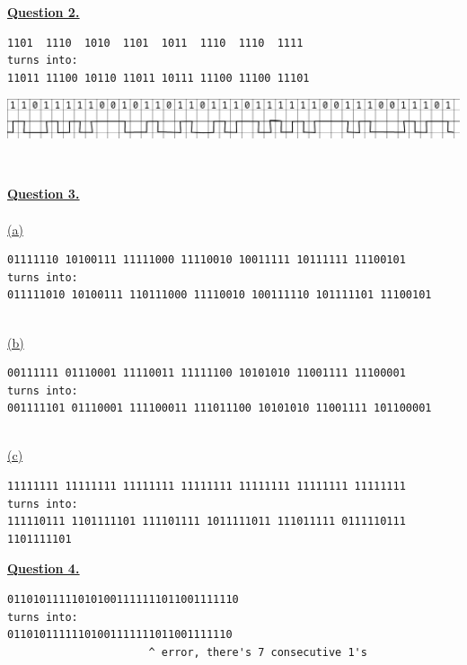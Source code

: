 \documentclass[12pt]{article}
\begin{document}
\hyperlink{toc}{\hypertarget{2}{\LARGE \underline{\textbf{Question 2.}}}}
\begin{verbatim}
1101  1110  1010  1101  1011  1110  1110  1111
turns into:
11011 11100 10110 11011 10111 11100 11100 11101
\end{verbatim}
\begin{center}
	\includegraphics[width=\textwidth]{cscd58-a2-q2.jpg}
\end{center}
~\\

\newpage

\hyperlink{toc}{\LARGE \underline{\textbf{Question 3.}}}\\
~\\\hyperlink{toc}{\hypertarget{3.1}{(a)}}
\begin{verbatim}
01111110 10100111 11111000 11110010 10011111 10111111 11100101
turns into:
011111010 10100111 110111000 11110010 100111110 101111101 11100101
\end{verbatim}
~\\\hyperlink{toc}{\hypertarget{3.2}{(b)}}\\
\begin{verbatim}
00111111 01110001 11110011 11111100 10101010 11001111 11100001
turns into:
001111101 01110001 111100011 111011100 10101010 11001111 101100001
\end{verbatim}

~\\\hyperlink{toc}{\hypertarget{3.3}{(c)}}\\
\begin{verbatim}
11111111 11111111 11111111 11111111 11111111 11111111 11111111
turns into:
111110111 1101111101 111101111 1011111011 111011111 0111110111 1101111101
\end{verbatim}
\newpage

\hyperlink{toc}{\hypertarget{4}{\LARGE \underline{\textbf{Question 4.}}}}\\
\begin{verbatim}
011010111110101001111111011001111110
turns into:
01101011111101001111111011001111110
                      ^ error, there's 7 consecutive 1's
\end{verbatim}
\newpage
\end{document}
